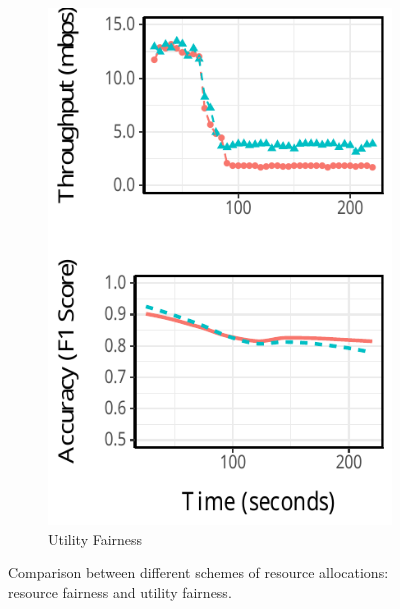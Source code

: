\begin{figure}
\begin{subfigure}[t]{0.49\columnwidth}
    \centering
    \includegraphics[width=\textwidth]{figures/multitask-eq-acc.pdf}
    \caption{Utility Fairness}
    \label{fig:eq-acc}
  \end{subfigure}
  \caption{Comparison between different schemes of resource allocations:
    resource fairness and utility fairness.}
  \label{fig:multitask}
\end{figure}

